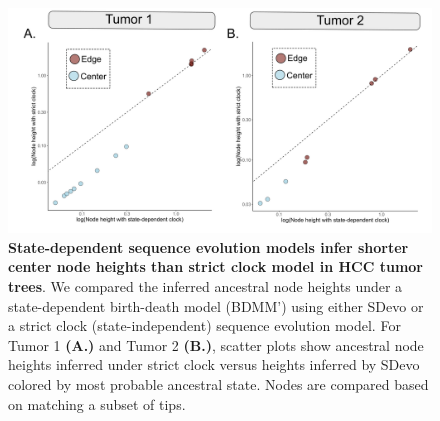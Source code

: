 \documentclass[12pt]{elife_based}
\begin{document}
\begin{figure}
\includegraphics[width=\textwidth]{figures/figure_5_supp_clocks_node_height_comparison_wgs.pdf}
\caption{\textbf{State-dependent sequence evolution models infer shorter center node heights than strict clock model in HCC tumor trees}. We compared the inferred ancestral node heights under a state-dependent birth-death model (BDMM') using either SDevo or a strict clock (state-independent) sequence evolution model. For Tumor 1 \textbf{(A.)} and Tumor 2 \textbf{(B.)}, scatter plots show ancestral node heights inferred under strict clock versus heights inferred by SDevo colored by most probable ancestral state. Nodes are compared based on matching a subset of tips.} 
\label{figsupp:sf5-4}
\end{figure} 
\end{document}
